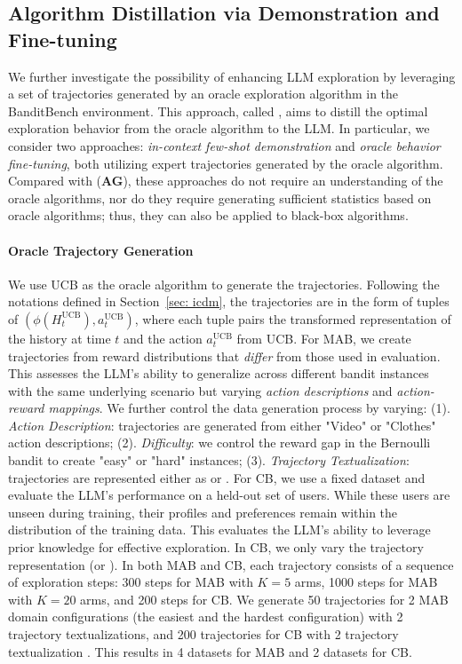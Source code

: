 \subsection{Algorithm Distillation via Demonstration and Fine-tuning}
\label{subsec: learning_optimal_behavior}


We further investigate the possibility of enhancing LLM exploration by leveraging a set of trajectories generated by an oracle exploration algorithm in the BanditBench environment. 
This approach, called \emph{\ad}, aims to distill the optimal exploration behavior from the oracle algorithm to the LLM.
In particular, we consider two approaches: \emph{in-context few-shot demonstration} and \emph{oracle behavior fine-tuning}, both utilizing expert trajectories generated by the oracle algorithm. 
Compared with \ag (\textbf{AG}), these approaches do not require an understanding of the oracle algorithms, nor do they require generating sufficient statistics based on oracle algorithms; thus, they can also be applied to black-box algorithms. 



\paragraph{Oracle Trajectory Generation} 

We use UCB as the oracle algorithm to generate the trajectories.
Following the notations defined in Section~\ref{sec: icdm}, the trajectories are in the form of tuples of $( \phi(H^{\text{UCB}}_t), a^{\text{UCB}}_t)$, where each tuple pairs the transformed representation of the history at time $t$ and the action $a^{\text{UCB}}_t$ from UCB.
For MAB, we create trajectories from reward distributions that \textit{differ} from those used in evaluation. This assesses the LLM's ability to generalize across different bandit instances with the same underlying scenario but varying \textit{action descriptions} and \textit{action-reward mappings}.
We further control the data generation process by varying: (1). \emph{Action Description}: trajectories are generated from either "Video" or "Clothes" action descriptions;
(2). \emph{Difficulty}: we control the reward gap in the Bernoulli bandit to create "easy" or "hard" instances;
(3). \emph{Trajectory Textualization}: trajectories are represented either as \RH or \AG.
For CB, we use a fixed dataset and evaluate the LLM's performance on a held-out set of users. While these users are unseen during training, their profiles and preferences remain within the distribution of the training data. This evaluates the LLM's ability to leverage prior knowledge for effective exploration.  In CB, we only vary the trajectory representation (\RH or \AG).
In both MAB and CB, each trajectory consists of a sequence of exploration steps: 300 steps for MAB with $K=5$ arms, 1000 steps for MAB with $K=20$ arms, and 200 steps for CB. 
We generate 50 trajectories for 2 MAB domain configurations (the easiest and the hardest configuration) with 2 trajectory textualizations, and 200 trajectories for CB with 2 trajectory textualization . This results in 4 \ad datasets for MAB and 2 datasets for CB. 


